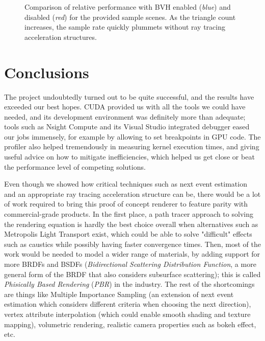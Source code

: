 \documentclass[12pt,a4paper]{article}
\begin{document}
\begin{figure}[h]
\centering

\caption{Comparison of relative performance with BVH enabled (\textit{blue}) and disabled (\textit{red}) for the provided sample scenes. As the triangle count increases, the sample rate quickly plummets without ray tracing acceleration structures.}
\label{img:bvh_perf}
\end{figure}

\section{Conclusions}

The project undoubtedly turned out to be quite successful, and the results have exceeded our best hopes. CUDA provided us with all the tools we could have needed, and its development environment was definitely more than adequate; tools such as Nsight Compute and its Visual Studio integrated debugger eased our jobs immensely, for example by allowing to set breakpoints in GPU code. The profiler also helped tremendously in measuring kernel execution times, and giving useful advice on how to mitigate inefficiencies, which helped us get close or beat the performance level of competing solutions.

Even though we showed how critical techniques such as next event estimation and an appropriate ray tracing acceleration structure can be, there would be a lot of work required to bring this proof of concept renderer to feature parity with commercial-grade products. In the first place, a path tracer approach to solving the rendering equation is hardly the best choice overall when alternatives such as Metropolis Light Transport exist, which could be able to solve "difficult" effects such as caustics while possibly having faster convergence times. Then, most of the work would be needed to model a wider range of materials, by adding support for more BRDFs and BSDFs (\textit{Bidirectional Scattering Distribution Function}, a more general form of the BRDF that also considers subsurface scattering); this is called \textit{Phisically Based Rendering} (\textit{PBR}) in the industry. The rest of the shortcomings are things like Multiple Importance Sampling (an extension of next event estimation which considers different criteria when choosing the next direction), vertex attribute interpolation (which could enable smooth shading and texture mapping), volumetric rendering, realistic camera properties such as bokeh effect, etc.

\printbibliography
\end{document}
